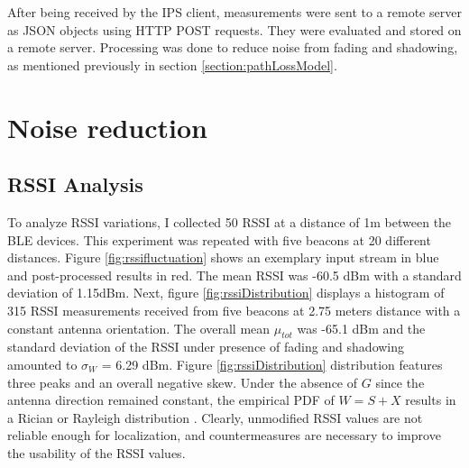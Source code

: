 \documentclass[a4paper, oneside]{ipsreport}
\begin{document}
After being received by the IPS client, measurements were sent to a remote server as JSON objects using HTTP POST requests. They were evaluated and stored on a remote server. Processing was done to reduce noise from fading and shadowing, as mentioned previously in section \ref{section:pathLossModel}.

\section{Noise reduction}
\subsection{RSSI Analysis}
To analyze RSSI variations, I collected 50 RSSI at a distance of 1m between the BLE devices. This experiment was repeated with five beacons at 20 different distances. Figure \ref{fig:rssifluctuation} shows an exemplary input stream in blue and post-processed results in red. The mean RSSI was -60.5 dBm with a standard deviation of 1.15dBm. Next, figure \ref{fig:rssiDistribution} displays a histogram of 315 RSSI measurements received from five beacons at 2.75 meters distance with a constant antenna orientation. The overall mean $\mu_{tot}$ was -65.1 dBm and the standard deviation of the RSSI under presence of fading and shadowing amounted to $\sigma_{W}$ = 6.29 dBm. Figure \ref{fig:rssiDistribution} distribution features three peaks and an overall negative skew. Under the absence of $G$ since the antenna direction remained constant, the empirical PDF of $W = S + X$ results in a Rician or Rayleigh distribution \autocite{AdvertisingInterval}. Clearly, unmodified RSSI values are not reliable enough for localization, and countermeasures are necessary to improve the usability of the RSSI values.
\end{document}
